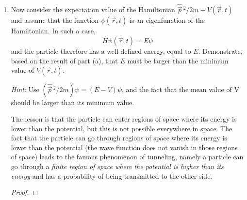 \documentclass[../psets.tex]{subfiles}
\begin{document}
\begin{enumerate}
\begin{enumerate}
\begin{proof}
\begin{align*}
                &= \int\dd^3\vec{r}\ |\vec{\nabla}(\hbar\psi)|^2
            \end{align*}
            To clarify, we know that the first term given by integration by parts goes to zero because of the divergence theorem. In particular, let $\Omega$ be a finite region of space encapsulated by $\dd\Omega$; we will take the limit as $\Omega\to\C^3$ and $\dd\Omega$ approaches the boundary of $\C^3$. Then
            \begin{equation*}
                \int_\Omega\vec{\nabla}\cdot[\hbar\psi^*\vec{\nabla}(\hbar\psi)] = \int_{\dd\Omega}[\hbar\psi^*\vec{\nabla}(\hbar\psi)]\cdot\hat{n}\dd{S}
            \end{equation*}
            Essentially, this means that the original integral is equal to an integral of an integrand containing $\psi^*$ (which goes to zero at the "boundary" of $\C^3$) at a surface approaching the boundary through the aforementioned limit. This means that the second integral --- under the limit that $\dd\Omega$ approaches the "boundary" of $\C^3$ --- is zero, justifying the original substitution.
        \end{proof}
        \item Now consider the expectation value of the Hamiltonian $\hat{\vec{p}}{\,}^2/2m+V(\vec{r},t)$ and assume that the function $\psi(\vec{r},t)$ is an eigenfunction of the Hamiltonian. In such a case,
        \begin{equation*}
            \hat{H}\psi(\vec{r},t) = E\psi
        \end{equation*}
        and the particle therefore has a well-defined energy, equal to $E$. Demonstrate, based on the result of part (a), that $E$ must be larger than the minimum value of $V(\vec{r},t)$.\par
        \emph{Hint}: Use $(\hat{\vec{p}}{\,}^2/2m)\psi=(E-V)\psi$, and the fact that the mean value of V should be larger than its minimum value.\par
        The lesson is that the particle can enter regions of space where its energy is lower than the potential, but this is not possible everywhere in space. The fact that the particle can go through regions of space where its energy is lower than the potential (the wave function does not vanish in those regions of space) leads to the famous phenomenon of tunneling, namely a particle can go through a \emph{finite region of space where the potential is higher than its energy} and has a probability of being transmitted to the other side.
        \begin{proof}

\end{proof}
\end{enumerate}
\end{enumerate}
\end{document}
